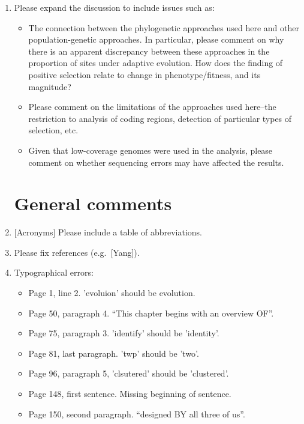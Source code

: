 \begin{enumerate}
\item{Please expand the discussion to include issues such as:
  \begin{itemize}
  \item{The connection between the phylogenetic approaches used here
    and other population-genetic approaches. In particular, please
    comment on why there is an apparent discrepancy between these
    approaches in the proportion of sites under adaptive
    evolution. How does the finding of positive selection relate to
    change in phenotype/fitness, and its magnitude?}
  \item{Please comment on the limitations of the approaches used
    here--the restriction to analysis of coding regions, detection of
    particular types of selection, etc.}
  \item{Given that low-coverage genomes were used in the analysis,
    please comment on whether sequencing errors may have affected the
    results.}
  \end{itemize}
}

\section{General comments}

\item{[Acronyms] Please include a table of abbreviations.

}

\item{Please fix references (e.g.\ [Yang]).}

\item{Typographical errors:
  \begin{itemize}
  \item{Page 1, line 2. 'evoluion' should be evolution.}
  \item{Page 50, paragraph 4. “This chapter begins with an overview
    OF”.}
  \item{Page 75, paragraph 3. 'identify' should be 'identity'.}
  \item{Page 81, last paragraph. 'twp' should be 'two'.}
  \item{Page 96, paragraph 5, 'clsutered' should be 'clustered'.}
  \item{Page 148, first sentence. Missing beginning of sentence.}
  \item{Page 150, second paragraph. “designed BY all three of us”.}
  \end{itemize}
}
\end{enumerate}
